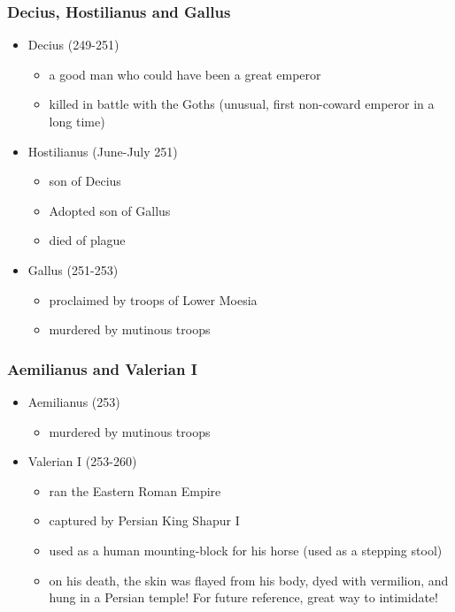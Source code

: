 \documentclass[12pt, twoside]{article}
\begin{document}
\subsubsection{Decius, Hostilianus and Gallus}
\begin{itemize}
\item Decius (249-251)
	\begin{itemize}
	\item a good man who could have been a great emperor
	\item killed in battle with the Goths (unusual, first non-coward emperor in a long time)
	\end{itemize}
\item Hostilianus (June-July 251)
	\begin{itemize}
	\item son of Decius
	\item Adopted son of Gallus
	\item died of plague
	\end{itemize}
\item Gallus (251-253)
	\begin{itemize}
	\item proclaimed by troops of Lower Moesia
	\item murdered by mutinous troops
	\end{itemize}
\end{itemize}

\subsubsection{Aemilianus and Valerian I}
\begin{itemize}
\item Aemilianus (253)
	\begin{itemize}
	\item murdered by mutinous troops
	\end{itemize}
\item Valerian I (253-260)
	\begin{itemize}
	\item ran the Eastern Roman Empire
	\item captured by Persian King Shapur I
	\item used as a human mounting-block for his horse (used as a stepping stool)
	\item on his death, the skin was flayed from his body, dyed with vermilion, and hung in a Persian temple!  For future reference, great way to intimidate! 
	\end{itemize}
\end{itemize}
\end{document}
